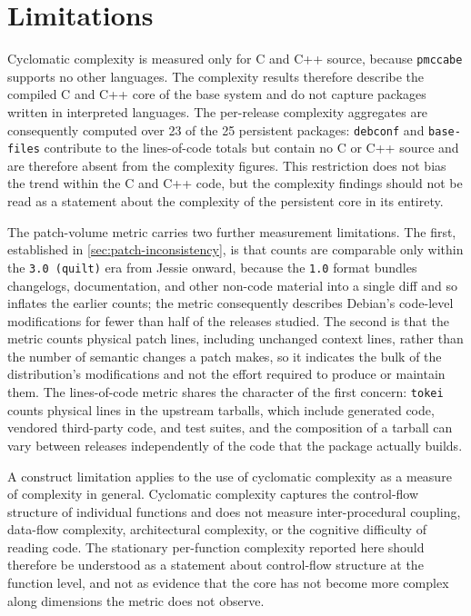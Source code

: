 \section{Limitations}
\label{sec:limitations}

Cyclomatic complexity is measured only for C and C++ source, because \texttt{pmccabe} supports no other languages. The complexity results therefore describe the compiled C and C++ core of the base system and do not capture packages written in interpreted languages. The per-release complexity aggregates are consequently computed over 23 of the 25 persistent packages: \texttt{debconf} and \texttt{base-files} contribute to the lines-of-code totals but contain no C or C++ source and are therefore absent from the complexity figures. This restriction does not bias the trend within the C and C++ code, but the complexity findings should not be read as a statement about the complexity of the persistent core in its entirety.

The patch-volume metric carries two further measurement limitations. The first, established in \autoref{sec:patch-inconsistency}, is that counts are comparable only within the \texttt{3.0 (quilt)} era from Jessie onward, because the \texttt{1.0} format bundles changelogs, documentation, and other non-code material into a single diff and so inflates the earlier counts; the metric consequently describes Debian's code-level modifications for fewer than half of the releases studied. The second is that the metric counts physical patch lines, including unchanged context lines, rather than the number of semantic changes a patch makes, so it indicates the bulk of the distribution's modifications and not the effort required to produce or maintain them. The lines-of-code metric shares the character of the first concern: \texttt{tokei} counts physical lines in the upstream tarballs, which include generated code, vendored third-party code, and test suites, and the composition of a tarball can vary between releases independently of the code that the package actually builds.

A construct limitation applies to the use of cyclomatic complexity as a measure of complexity in general. Cyclomatic complexity captures the control-flow structure of individual functions and does not measure inter-procedural coupling, data-flow complexity, architectural complexity, or the cognitive difficulty of reading code. The stationary per-function complexity reported here should therefore be understood as a statement about control-flow structure at the function level, and not as evidence that the core has not become more complex along dimensions the metric does not observe.

